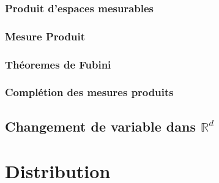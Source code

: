 \documentclass[3pt]{article}
\begin{document}
\bigskip 

\subsubsection{Produit d'espaces mesurables}

\bigskip 

\subsubsection{Mesure Produit}

\bigskip 

\subsubsection{Th\'{e}oremes de Fubini}

\bigskip 

\subsubsection{Compl\'{e}tion des mesures produits}

\bigskip 

\bigskip 

\subsection{Changement de variable dans $\mathbb{R}^{d}$}

\bigskip 

\bigskip 

\bigskip 

\bigskip 

\bigskip 

\section{Distribution}
\end{document}
